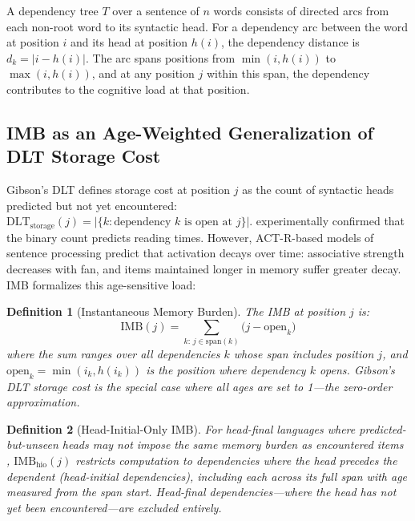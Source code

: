 \documentclass[11pt,letterpaper]{article}
\newtheorem{definition}{Definition}
\begin{document}
A dependency tree $T$ over a sentence of $n$ words consists of directed arcs from each non-root word to its syntactic head. For a dependency arc between the word at position $i$ and its head at position $h(i)$, the dependency distance is $d_k = |i - h(i)|$. The arc spans positions from $\min(i, h(i))$ to $\max(i, h(i))$, and at any position $j$ within this span, the dependency contributes to the cognitive load at that position.

\subsection{IMB as an Age-Weighted Generalization of DLT Storage Cost}

Gibson's DLT \citep{Gibson2000} defines storage cost at position $j$ as the count of syntactic heads predicted but not yet encountered: $\text{DLT}_{\text{storage}}(j) = |\{k : \text{dependency } k \text{ is open at } j\}|$. \citet{Chen2005} experimentally confirmed that the binary count predicts reading times. However, ACT-R-based models of sentence processing \citep{Lewis2005} predict that activation decays over time: associative strength decreases with fan, and items maintained longer in memory suffer greater decay. IMB formalizes this age-sensitive load:

\begin{definition}[Instantaneous Memory Burden]
\label{def:imb}
The IMB at position $j$ is:
\begin{equation}
\text{IMB}(j) = \sum_{k:\, j \in \text{span}(k)} \bigl(j - \text{open}_k\bigr)
\end{equation}
where the sum ranges over all dependencies $k$ whose span includes position $j$, and $\text{open}_k = \min(i_k, h(i_k))$ is the position where dependency $k$ opens. Gibson's DLT storage cost is the special case where all ages are set to 1---the zero-order approximation.
\end{definition}

\begin{definition}[Head-Initial-Only IMB]
\label{def:hio}
For head-final languages where predicted-but-unseen heads may not impose the same memory burden as encountered items \citep{Konieczny2000, Levy2008}, $\text{IMB}_{\text{hio}}(j)$ restricts computation to dependencies where the head precedes the dependent (head-initial dependencies), including each across its full span with age measured from the span start. Head-final dependencies---where the head has not yet been encountered---are excluded entirely.
\end{definition}
\end{document}
